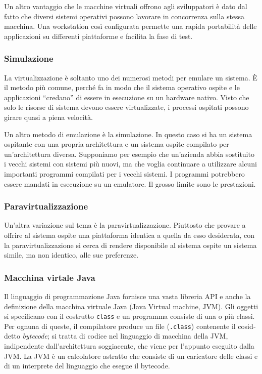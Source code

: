 \documentclass[11pt,a4paper]{article}
\begin{document}
Un altro vantaggio che le macchine virtuali offrono agli sviluppatori è dato dal fatto
che diversi sistemi operativi possono lavorare in concorrenza sulla stessa macchina. Una
workstation così configurata permette una rapida portabilità delle applicazioni su differenti
piattaforme e facilita la fase di test.

\subsubsection{Simulazione}
La virtualizzazione è soltanto uno dei numerosi metodi per emulare un si­stema. È il metodo più comune, perché fa in modo che il sistema operativo ospite e le appli­cazioni “credano” di essere in esecuzione su un hardware nativo. Visto che solo le risorse di
sistema devono essere virtualizzate, i processi ospitati possono girare quasi a piena velocità.

Un altro metodo di emulazione è la simulazione. In questo caso si ha un sistema ospi­tante con una propria architettura e un sistema ospite compilato per un'architettura diversa.
Supponiamo per esempio che un'azienda abbia sostituito i vecchi sistemi con sistemi più
nuovi, ma che voglia continuare a utilizzare alcuni importanti programmi compilati per i
vecchi sistemi. I programmi potrebbero essere mandati in esecuzione su un emulatore.
Il grosso limite sono le prestazioni.

\subsubsection{Paravirtualizzazione}
Un'altra variazione sul tema è la paravirtualizzazione. Piuttosto che provare a offrire al si­stema ospite una piattaforma identica a quella da esso desiderata, con la paravirtualizzazio­ne si cerca di rendere disponibile al sistema ospite un sistema simile, ma non identico, alle
sue preferenze.

\subsubsection{Macchina virtale Java}
Il linguaggio di programmazione Java fornisce una vasta libreria API e anche la definizione della macchi­na virtuale Java (Java Virtual machine, JVM).
Gli oggetti si specificano con il costrutto \texttt{class} e un programma consiste di una o più
classi. Per ognuna di queste, il compilatore produce un file (\texttt{.class}) contenente il cosid­detto \emph{bytecode}; si tratta di codice nel linguaggio di macchina della JVM, indipendente dal­l'architettura soggiacente, che viene per l'appunto eseguito dalla JVM.
La JVM è un calcolatore astratto che consiste di un caricatore delle classi e di un inter­prete del linguaggio che esegue il bytecode.
\end{document}
